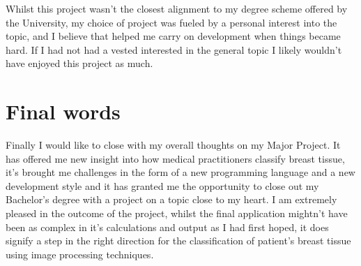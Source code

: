 Whilst this project wasn't the closest alignment to my degree scheme offered by the University, my choice of project was fueled by a personal interest into the topic, and I believe that helped me carry on development when things became hard. If I had not had a vested interested in the general topic I likely wouldn't have enjoyed this project as much.

\section{Final words}

Finally I would like to close with my overall thoughts on my Major Project. It has offered me new insight into how medical practitioners classify breast tissue, it's brought me challenges in the form of a new programming language and a new development style and it has granted me the opportunity to close out my Bachelor's degree with a project on a topic close to my heart. I am extremely pleased in the outcome of the project, whilst the final application mightn't have been as complex in it's calculations and output as I had first hoped, it does signify a step in the right direction for the classification of patient's breast tissue using image processing techniques.
